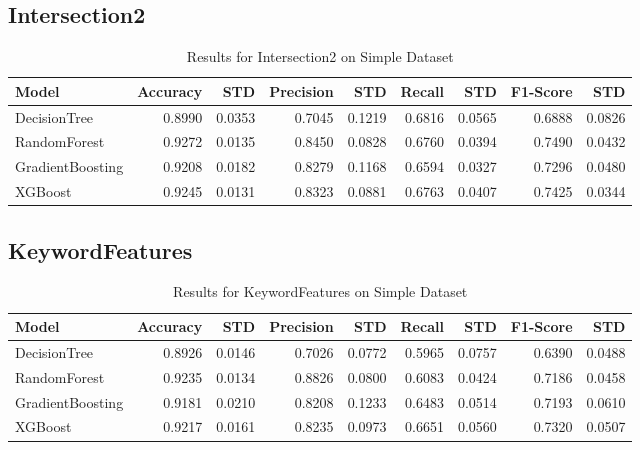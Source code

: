 \documentclass{article}
\begin{document}
\subsection{Intersection2}
\begin{table}[h!]
\centering
\caption{Results for Intersection2 on Simple Dataset}
\begin{tabular}{l|rr|rr|rr|rr}
\hline
Model & Accuracy & STD & Precision & STD & Recall & STD & F1-Score & STD \\
\hline
DecisionTree & 0.8990 & 0.0353 & 0.7045 & 0.1219 & 0.6816 & 0.0565 & 0.6888 & 0.0826 \\
RandomForest & 0.9272 & 0.0135 & 0.8450 & 0.0828 & 0.6760 & 0.0394 & 0.7490 & 0.0432 \\
GradientBoosting & 0.9208 & 0.0182 & 0.8279 & 0.1168 & 0.6594 & 0.0327 & 0.7296 & 0.0480 \\
XGBoost & 0.9245 & 0.0131 & 0.8323 & 0.0881 & 0.6763 & 0.0407 & 0.7425 & 0.0344 \\
\hline
\end{tabular}
\end{table}

\subsection{KeywordFeatures}
\begin{table}[h!]
\centering
\caption{Results for KeywordFeatures on Simple Dataset}
\begin{tabular}{l|rr|rr|rr|rr}
\hline
Model & Accuracy & STD & Precision & STD & Recall & STD & F1-Score & STD \\
\hline
DecisionTree & 0.8926 & 0.0146 & 0.7026 & 0.0772 & 0.5965 & 0.0757 & 0.6390 & 0.0488 \\
RandomForest & 0.9235 & 0.0134 & 0.8826 & 0.0800 & 0.6083 & 0.0424 & 0.7186 & 0.0458 \\
GradientBoosting & 0.9181 & 0.0210 & 0.8208 & 0.1233 & 0.6483 & 0.0514 & 0.7193 & 0.0610 \\
XGBoost & 0.9217 & 0.0161 & 0.8235 & 0.0973 & 0.6651 & 0.0560 & 0.7320 & 0.0507 \\
\hline
\end{tabular}
\end{table}
\end{document}
